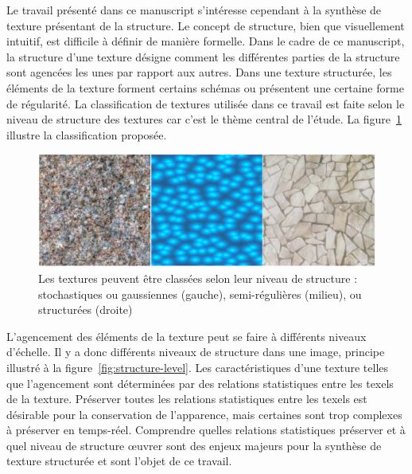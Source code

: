 Le travail présenté dans ce manuscript s'intéresse cependant à la synthèse de texture présentant de la structure. Le concept de structure, bien que visuellement intuitif, est difficile à définir de manière formelle. Dans le cadre de ce manuscript, la \og structure \fg d'une texture désigne comment les différentes parties de la structure sont agencées les unes par rapport aux autres. Dans une texture structurée, les éléments de la texture forment certains schémas ou présentent une certaine forme de régularité. La classification de textures utilisée dans ce travail est faite selon le niveau de structure des textures car c'est le thème central de l'étude. La figure~\ref{fig:échelle-structure} illustre la classification proposée.

\bigskip

\begin{figure}[h]
    \centering
    \includegraphics[width=\textwidth]{contenu/resources/images/structure_scale_loucas}
    \caption[Classification des textures selon leur niveau de structure]{Les textures peuvent être classées selon leur niveau de structure : stochastiques ou gaussiennes (gauche), semi-régulières (milieu), ou structurées (droite)}
    \label{fig:échelle-structure}
\end{figure}

L'agencement des éléments de la texture peut se faire à différents niveaux d'échelle. Il y a donc différents niveaux de structure dans une image, principe illustré à la figure~\ref{fig:structure-level}. Les caractéristiques d'une texture telles que l'agencement sont déterminées par des relations statistiques entre les texels de la texture. Préserver toutes les relations statistiques entre les texels est désirable pour la conservation de l'apparence, mais certaines sont trop complexes à préserver en temps-réel. Comprendre quelles relations statistiques préserver et à quel niveau de structure œuvrer sont des enjeux majeurs pour la synthèse de texture structurée et sont l'objet de ce travail.

